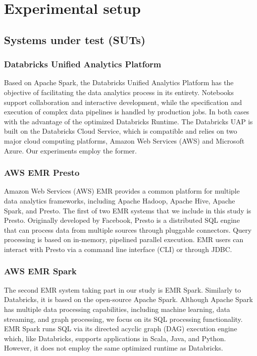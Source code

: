 \section{Experimental setup}\label{experimentalSetup}

\subsection{Systems under test (SUTs)}

\subsubsection{Databricks Unified Analytics Platform}

Based on Apache Spark, the Databricks Unified Analytics Platform has the objective of facilitating the data analytics process in its entirety. Notebooks support collaboration and interactive development, while the specification and execution of complex data pipelines is handled by production jobs. In both cases with the advantage of the optimized Databricks Runtime. The Databricks UAP is built on the Databricks Cloud Service, which is compatible and relies on two major cloud computing platforms, Amazon Web Services (AWS) and Microsoft Azure. Our experiments employ the former.

\subsubsection{AWS EMR Presto}

Amazon Web Services (AWS) EMR provides a common platform for multiple data analytics frameworks, including Apache Hadoop, Apache Hive, Apache Spark, and Presto. The first of two EMR systems that we include in this study is Presto. Originally developed by Facebook, Presto is a distributed SQL engine that can process data from multiple sources through pluggable connectors. Query processing is based on in-memory, pipelined parallel execution. EMR users can interact with Presto via a command line interface (CLI) or through JDBC.

\subsubsection{AWS EMR Spark}

The second EMR system taking part in our study is EMR Spark. Similarly to Databricks, it is based on the open-source Apache Spark. Although Apache Spark has multiple data processing capabilities, including machine learning, data streaming, and graph processing, we focus on its SQL processing functionality. EMR Spark runs SQL via its directed acyclic graph (DAG) execution engine which, like Databricks, supports applications in Scala, Java, and Python. However, it does not employ the same optimized runtime as Databricks.

